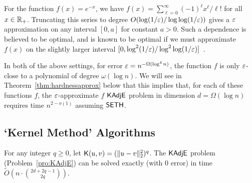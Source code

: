 \begin{example}
For the function $f(x) = e^{-x}$, we have $f(x) = \sum_{\ell = 0}^\infty (-1)^\ell x^\ell / \ell!$ for all $x \in {\mathbb R}_+$. Truncating this series to degree $O(\log(1/\varepsilon) / \log\log(1/\varepsilon))$ gives a $\varepsilon$ approximation on any interval $[0,a]$ for constant $a>0$. Such a dependence is believed to be optimal, and is known to be optimal if we must approximate $f(x)$ on the slightly larger interval $[0,\log^2 (1/\varepsilon) / \log^2 \log(1/\varepsilon)]$~\cite[Section~5]{sachdeva2014faster}.
\end{example}

In both of the above settings, for error $\varepsilon = n^{- \Omega(\log^4 n)}$, the function $f$ is only $\varepsilon$-close to a polynomial of degree $\omega(\log n)$. We will see in Theorem~\ref{thm:hardnessapprox} below that this implies that, for each of these functions $f$, the $\varepsilon$-approximate $f$ $\mathsf{KAdjE}$ problem in dimension $d = \Omega(\log n)$ requires time $n^{2 - o(1)}$ assuming $\mathsf{SETH}$.


\subsection{`Kernel Method' Algorithms}

\begin{lemma} \label{lem:low-rank-mmult}
For any integer $q \geq 0$, let $\mathsf{K}(u,v) = (\|u-v\|_2^2)^q$. The $\mathsf{KAdjE}$ problem (Problem~\ref{pro:KAdjE}) can be solved exactly (with $0$ error) in time $\tilde{O}( n \cdot \binom{2d+2q-1}{2q} )$.
\end{lemma}

